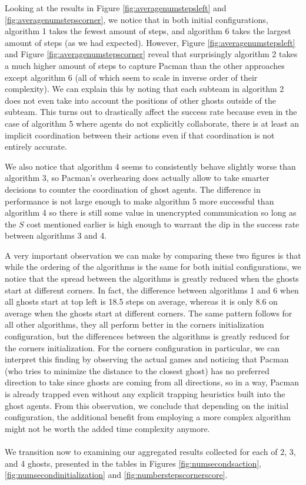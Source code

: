 \documentclass[11pt]{article}
\begin{document}
\begin{multicols}{2}
Looking at the results in Figure \ref{fig:averagenumstepsleft} and  \ref{fig:averagenumstepscorner}, we notice that in both initial configurations, algorithm 1 takes the fewest amount of steps, and algorithm 6 takes the largest amount of steps (as we had expected). However, Figure \ref{fig:averagenumstepsleft} and Figure \ref{fig:averagenumstepscorner} reveal that surprisingly algorithm 2 takes a much higher amount of steps to capture Pacman than the other approaches except algorithm 6 (all of which seem to scale in inverse order of their complexity). We can explain this by noting that each subteam in algorithm 2 does not even take into account the positions of other ghosts outside of the subteam. This turns out to drastically affect the success rate because even in the case of algorithm 5 where agents do not explicitly collaborate, there is at least an implicit coordination between their actions even if that coordination is not entirely accurate.

We also notice that algorithm 4 seems to consistently behave slightly worse than algorithm 3, so Pacman's overhearing does actually allow to take smarter decisions to counter the coordination of ghost agents. The difference in performance is not large enough to make algorithm 5 more successful than algorithm 4 so there is still some value in unencrypted communication so long as the $S$ cost mentioned earlier is high enough to warrant the dip in the success rate between algorithms 3 and 4.

A very important observation we can make by comparing these two figures is that while the ordering of the algorithms is the same for both initial configurations, we notice that the spread between the algorithms is greatly reduced when the ghosts start at different corners. In fact, the difference between algorithms 1 and 6 when all ghosts start at top left is 18.5 steps on average, whereas it is only 8.6 on average when the ghosts start at different corners. The same pattern follows for all other algorithms, they all perform better in the corners initialization configuration, but the differences between the algorithms is greatly reduced for the corners initialization. For the corners configuration in particular, we can interpret this finding by observing the actual games and noticing that Pacman (who tries to minimize the distance to the closest ghost) has no preferred direction to take since ghosts are coming from all directions, so in a way, Pacman is already trapped even without any explicit trapping heuristics built into the ghost agents. From this observation, we conclude that depending on the initial configuration, the additional benefit from employing a more complex algorithm might not be worth the added time complexity anymore.\\\\

We transition now to examining our aggregated results collected for each of 2, 3, and 4 ghosts, presented in the tables in Figures \ref{fig:numsecondsaction}, \ref{fig:numsecondinitialization} and \ref{fig:numberstepscornerscore}. 

\end{multicols}
\end{document}
